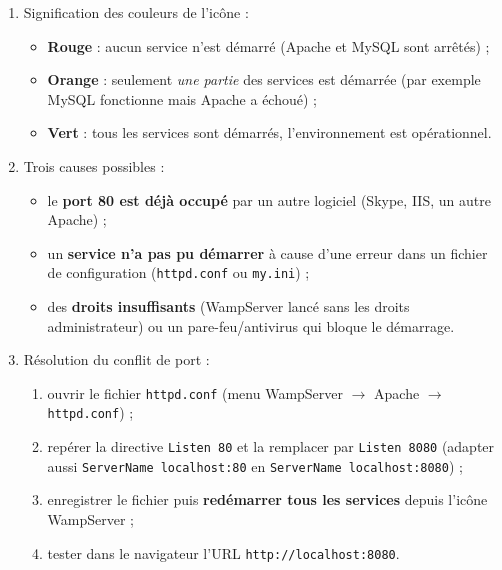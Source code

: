 \documentclass[11pt]{article}
\newcounter{popsec}
\newcounter{popsub}
\newcommand{\courssub}[1]{%
  \stepcounter{popsub}%
  \par\vspace{9pt}\noindent{\popxbold\fontsize{11.5}{13}\selectfont\color{popink}{\color{poporange}\thepopsec.\thepopsub}\hspace{6pt}#1}\par\nopagebreak\vspace{4pt}
}
\begin{document}
\courssub{Je m'entraîne}

\begin{corrige}
\begin{enumerate}
\item Signification des couleurs de l'icône :
\begin{itemize}
\item \textbf{Rouge} : aucun service n'est démarré (Apache et MySQL sont arrêtés) ;
\item \textbf{Orange} : seulement \emph{une partie} des services est démarrée (par exemple MySQL fonctionne mais Apache a échoué) ;
\item \textbf{Vert} : tous les services sont démarrés, l'environnement est opérationnel.
\end{itemize}
\item Trois causes possibles :
\begin{itemize}
\item le \textbf{port 80 est déjà occupé} par un autre logiciel (Skype, IIS, un autre Apache) ;
\item un \textbf{service n'a pas pu démarrer} à cause d'une erreur dans un fichier de configuration (\texttt{httpd.conf} ou \texttt{my.ini}) ;
\item des \textbf{droits insuffisants} (WampServer lancé sans les droits administrateur) ou un pare-feu/antivirus qui bloque le démarrage.
\end{itemize}
\item Résolution du conflit de port :
\begin{enumerate}
\item ouvrir le fichier \texttt{httpd.conf} (menu WampServer $\rightarrow$ Apache $\rightarrow$ \texttt{httpd.conf}) ;
\item repérer la directive \texttt{Listen 80} et la remplacer par \texttt{Listen 8080} (adapter aussi \texttt{ServerName localhost:80} en \texttt{ServerName localhost:8080}) ;
\item enregistrer le fichier puis \textbf{redémarrer tous les services} depuis l'icône WampServer ;
\item tester dans le navigateur l'URL \texttt{http://localhost:8080}.
\end{enumerate}
\end{enumerate}
\end{corrige}
\end{document}
